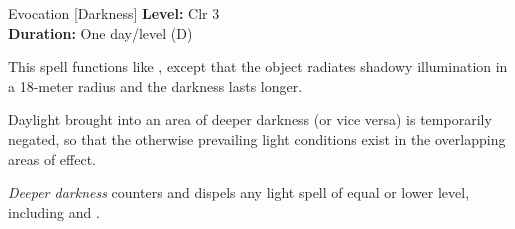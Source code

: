 {Evocation [Darkness]}
{
	\textbf{Level:}
	Clr 3\\
	\textbf{Duration:}
	One day/level (D)\\
}
{
	This spell functions like , except that the object radiates shadowy illumination in a 18-meter radius and the darkness lasts longer.

Daylight brought into an area of deeper darkness (or vice versa) is temporarily negated, so that the otherwise prevailing light conditions exist in the overlapping areas of effect.

	\emph{Deeper darkness} counters and dispels any light spell of equal or lower level, including  and .

}
